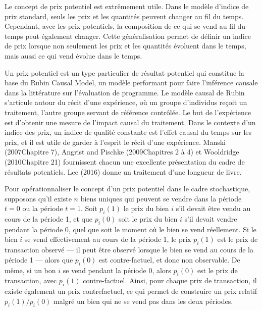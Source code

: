 \documentclass[
]{article}
\begin{document}
Le concept de prix potentiel est extrêmement utile. Dans le modèle d'indice de prix standard, seuls les prix et les quantités peuvent changer au fil du temps. Cependant, avec les prix potentiels, la composition de ce qui se vend au fil du temps peut également changer. Cette généralisation permet de définir un indice de prix lorsque non seulement les prix et les quantités évoluent dans le temps, mais aussi ce qui vend évolue dans le temps.

Un prix potentiel est un type particulier de résultat potentiel qui constitue la base du Rubin Causal Model, un modèle performant pour faire l'inférence causale dans la littérature sur l'évaluation de programme. Le modèle causal de Rubin s'articule autour du récit d'une expérience, où un groupe d'individus reçoit un traitement, l'autre groupe servant de référence contrôlée. Le but de l'expérience est d'obtenir une mesure de l'impact causal du traitement. Dans le contexte d'un indice des prix, un indice de qualité constante est l'effet causal du temps sur les prix, et il est utile de garder à l'esprit le récit d'une expérience. Manski (2007Chapitre 7), Angrist and Pischke (2009Chapitres 2 à 4) et Wooldridge (2010Chapitre 21) fournissent chacun une excellente présentation du cadre de résultats potentiels. Lee (2016) donne un traitement d'une longueur de livre.

Pour opérationnaliser le concept d'un prix potentiel dans le cadre stochastique, supposons qu'il existe \(n\) biens uniques qui peuvent se vendre dans la période \(t = 0\) ou la période \(t = 1\). Soit \(p_{i}(1)\) le prix du bien \(i\) s'il devait être vendu au cours de la période 1, et que \(p_{i}(0)\) soit le prix du bien \(i\) s'il devait vendre pendant la période 0, quel que soit le moment où le bien se vend réellement. Si le bien \(i\) se vend effectivement au cours de la période 1, le prix \(p_{i}(1)\) est le prix de transaction observé --- il peut être observé lorsque le bien se vend au cours de la période 1 --- alors que \(p_{i}(0)\) est contre-factuel, et donc non observable. De même, si un bon \(i\) se vend pendant la période 0, alors \(p_{i}(0)\) est le prix de transaction, avec \(p_{i}(1)\) contre-factuel. Ainsi, pour chaque prix de transaction, il existe également un prix contrefactuel, ce qui permet de construire un prix relatif \(p_{i}(1)/ p_{i}(0)\) malgré un bien qui ne se vend pas dans les deux périodes.
\end{document}
